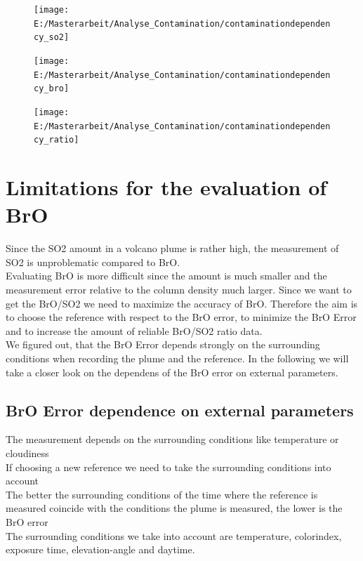 \documentclass  [
  paper    = a4,
  BCOR     = 10mm,
  twoside,
  fontsize = 12pt,
  fleqn,
  toc      = bibnumbered,
  toc      = listofnumbered,
  numbers  = noendperiod,
  headings = normal,
  listof   = leveldown,
  version  = 3.03
]                                       {scrreprt}
\begin{document}
	\begin{figure}
		\centering
		\texttt{[image: E:/Masterarbeit/Analyse\_Contamination/contaminationdependency\_so2]}
		\caption{}
		\label{fig:contaminationdependencyso2}
	\end{figure}
	\begin{figure}
		\centering
		\texttt{[image: E:/Masterarbeit/Analyse\_Contamination/contaminationdependency\_bro]}
		\caption{}
		\label{fig:contaminationdependencybro}
	\end{figure}
	\begin{figure}
		\centering
		\texttt{[image: E:/Masterarbeit/Analyse\_Contamination/contaminationdependency\_ratio]}
		\caption{}
		\label{fig:contaminationdependencyratio}
	\end{figure}
	\chapter{Limitations for the evaluation of  BrO}
	Since the SO2 amount in a volcano plume is rather high, the measurement of SO2 is unproblematic compared to BrO.\\
	Evaluating BrO is more difficult since the amount is much smaller and the measurement error relative to the column density much larger. Since we want to get the BrO/SO2 we need to maximize the accuracy of BrO.
	Therefore the aim is to choose the reference with respect to the BrO error, to minimize the BrO Error and to increase the amount of	reliable BrO/SO2 ratio data.\\
	We figured out, that the BrO Error depends strongly on the surrounding conditions when recording the plume and the reference. In the following we will take a closer look on the dependens of the BrO error on external parameters. 
	\section{BrO Error dependence on external parameters}
	The measurement depends on the surrounding conditions like temperature or cloudiness\\
	If choosing a new reference we need to take the surrounding conditions into account\\
	The better the surrounding conditions of the time where the reference is measured coincide with the conditions the plume is measured, the lower is the BrO error \\
	The surrounding conditions we take into account are temperature, colorindex, exposure time, elevation-angle and daytime.
\end{document}
